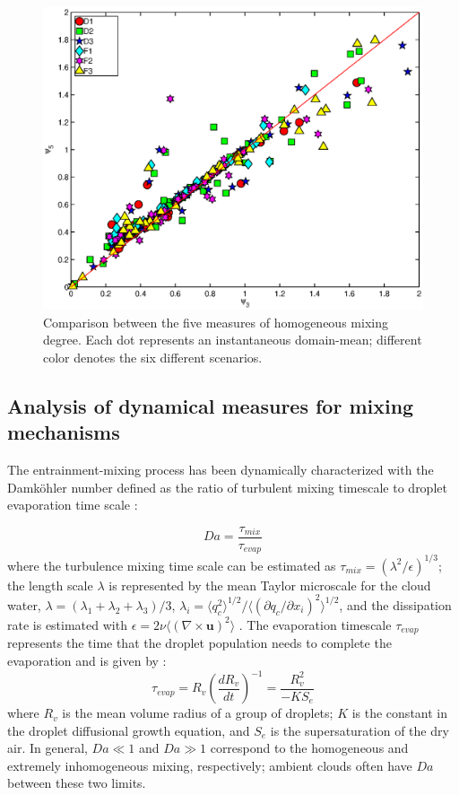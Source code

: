 \documentclass[draft,jgrga]{AGUTeX}
\begin{document}
\begin{article}
\begin{figure}[!htbp]
\includegraphics[width=0.45\linewidth]{Figures/phi3_phi5}
\caption{Comparison between the five measures of homogeneous mixing degree. Each dot represents an instantaneous domain-mean; different color denotes the six different scenarios.\label{phi_compare}}
\end{figure}

\subsection{Analysis of dynamical measures for mixing mechanisms}
The entrainment-mixing process has been dynamically characterized with the Damk{\"o}hler number defined as the ratio of 
turbulent mixing timescale to droplet evaporation time scale
\cite{Krueger1997Modeling, Grabowski1993Cumulus}:

\begin{equation}
Da=\frac{\tau_{mix}}{\tau_{evap}}\label{eq:DaNumber}
\end{equation}
where the turbulence mixing time scale can be estimated as $\tau_{mix} = (\lambda^2/\epsilon)^{1/3}$; the length scale $\lambda$ is represented by the mean Taylor microscale for the cloud water, $\lambda = 
(\lambda_1+\lambda_2+\lambda_3)/3$, $\lambda_i = \langle q_c^2\rangle^{1/2}/\langle(\partial q_c/\partial x_i)^2\rangle^{1/2}$, and the dissipation rate is estimated with $\epsilon = 2\nu\langle(\nabla\times \mathbf{u})^2\rangle$ \citep{And09}. The evaporation timescale $\tau_{evap}$ represents the time that the 
droplet population needs to complete the evaporation and is given by 
\cite{And09, Burnet2007Observational}:
\begin{equation}
\tau_{evap} = R_v(\frac{dR_v}{dt})^{-1} = \frac{R_v^2}{-KS_e}
\end{equation}
where $R_v$ is the mean volume radius of a group of droplets; $K$ is the constant in the 
droplet diffusional growth equation, and $S_e$ is the supersaturation of the dry air. In general, $Da \ll 1$ and $Da \gg 1$ correspond to the homogeneous and extremely inhomogeneous mixing, respectively; ambient clouds often have $Da$ between these two limits.


\end{article}
\end{document}
